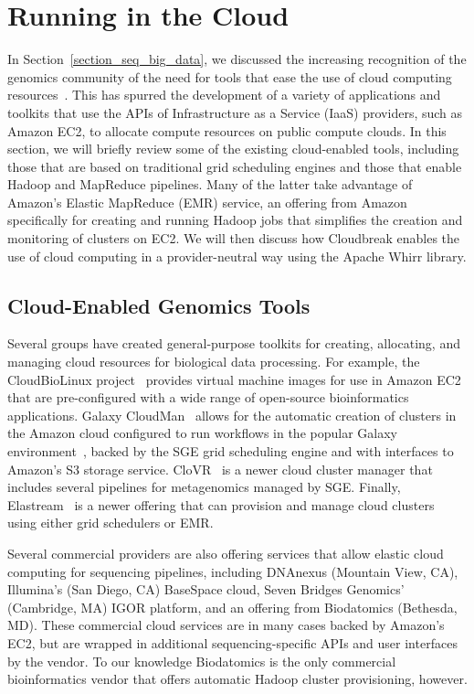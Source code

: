 \section{Running in the Cloud}\label{section_cloud_whirr}

In Section~\ref{section_seq_big_data}, we discussed the increasing recognition of the genomics community of the need for tools that ease the use of cloud computing resources~\cite{Schatz:2010js,Stein:2010gp}. This has spurred the development of a variety of applications and toolkits that use the APIs of Infrastructure as a Service (IaaS) providers, such as Amazon EC2, to allocate compute resources on public compute clouds. In this section, we will briefly review some of the existing cloud-enabled tools, including those that are based on traditional grid scheduling engines and those that enable Hadoop and MapReduce pipelines. Many of the latter take advantage of Amazon's Elastic MapReduce (EMR) service, an offering from Amazon specifically for creating and running Hadoop jobs that simplifies the creation and monitoring of clusters on EC2. We will then discuss how Cloudbreak enables the use of cloud computing in a provider-neutral way using the Apache Whirr library.

\subsection{Cloud-Enabled Genomics Tools}

Several groups have created general-purpose toolkits for creating, allocating, and managing cloud resources for biological data processing. For example, the CloudBioLinux project~\cite{Krampis:2012wo} provides virtual machine images for use in Amazon EC2 that are pre-configured with a wide range of open-source bioinformatics applications. Galaxy CloudMan~\cite{Afgan:2010fa} allows for the automatic creation of clusters in the Amazon cloud configured to run workflows in the popular Galaxy environment~\cite{Giardine:2005ig}, backed by the SGE grid scheduling engine and with interfaces to Amazon's S3 storage service. CloVR~\cite{Angiuoli:2011wl} is a newer cloud cluster manager that includes several pipelines for metagenomics managed by SGE. Finally, Elastream~\cite{Issa:2013jp} is a newer offering that can provision and manage cloud clusters using either grid schedulers or EMR. 

Several commercial providers are also offering services that allow elastic cloud computing for sequencing pipelines, including DNAnexus (Mountain View, CA), Illumina's (San Diego, CA) BaseSpace cloud, Seven Bridges Genomics' (Cambridge, MA) IGOR platform, and an offering from Biodatomics (Bethesda, MD). These commercial cloud services are in many cases backed by Amazon's EC2, but are wrapped in additional sequencing-specific APIs and user interfaces by the vendor. To our knowledge Biodatomics is the only commercial bioinformatics vendor that offers automatic Hadoop cluster provisioning, however. 

